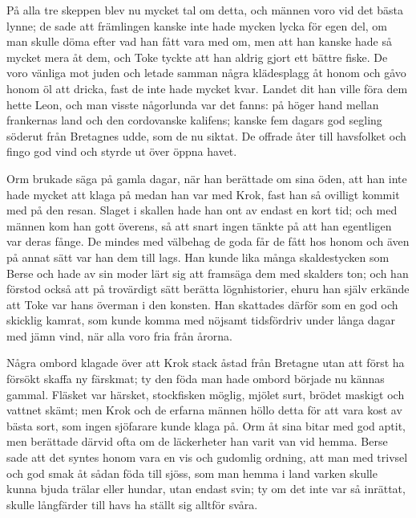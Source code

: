 \initial På alla tre skeppen blev nu mycket tal om detta, och männen voro vid det bästa lynne; de sade att främlingen kanske inte hade mycken lycka för egen del, om man skulle döma efter vad han fått vara med om, men att han kanske hade så mycket mera åt dem, och Toke tyckte att han aldrig gjort ett bättre fiske. De voro vänliga mot juden och letade samman några klädesplagg åt honom och gåvo honom öl att dricka, fast de inte hade mycket kvar. Landet dit han ville föra dem hette Leon, och man visste någorlunda var det fanns: på höger hand mellan frankernas land och den cordovanske kalifens; kanske fem dagars god segling söderut från Bretagnes udde, som de nu siktat. De offrade åter till havsfolket och fingo god vind och styrde ut över öppna havet.

%
%


\initial Orm brukade säga på gamla dagar, när han berättade om sina öden, att han inte hade mycket att klaga på medan han var med Krok, fast han så ovilligt kommit med på den resan. Slaget i skallen hade han ont av endast en kort tid; och med männen kom han gott överens, så att snart ingen tänkte på att han egentligen var deras fånge. De mindes med välbehag de goda får de fått hos honom och även på annat sätt var han dem till lags. Han kunde lika många skaldestycken som Berse och hade av sin moder lärt sig att framsäga dem med skalders ton; och han förstod också att på trovärdigt sätt berätta lögnhistorier, ehuru han själv erkände att Toke var hans överman i den konsten. Han skattades därför som en god och skicklig kamrat, som kunde komma med nöjsamt tidsfördriv under långa dagar med jämn vind, när alla voro fria från årorna.

\initial Några ombord klagade över att Krok stack åstad från Bretagne utan att först ha försökt skaffa ny färskmat; ty den föda man hade ombord började nu kännas gammal. Fläsket var härsket, stockfisken möglig, mjölet surt, brödet maskigt och vattnet skämt; men Krok och de erfarna männen höllo detta för att vara kost av bästa sort, som ingen sjöfarare kunde klaga på. Orm åt sina bitar med god aptit, men berättade därvid ofta om de läckerheter han varit van vid hemma. Berse sade att det syntes honom vara en vis och gudomlig ordning, att man med trivsel och god smak åt sådan föda till sjöss, som man hemma i land varken skulle kunna bjuda trälar eller hundar, utan endast svin; ty om det inte var så inrättat, skulle långfärder till havs ha ställt sig alltför svåra.

